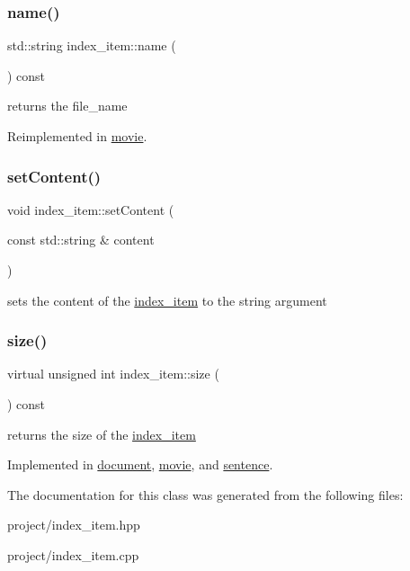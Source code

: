 \subsubsection{\texorpdfstring{name()}{name()}}
{\footnotesize\ttfamily std\+::string index\+\_\+item\+::name (\begin{DoxyParamCaption}{ }\end{DoxyParamCaption}) const\hspace{0.3cm}{\ttfamily [virtual]}}

returns the file\+\_\+name 

Reimplemented in \hyperlink{classmovie_ab8731bf52d5a7374ecc7ac297e3b99c3}{movie}.

\mbox{\label{classindex__item_a2a69d5f19a1e7056fef20df01dbc489e}} 
\subsubsection{\texorpdfstring{set\+Content()}{setContent()}}
{\footnotesize\ttfamily void index\+\_\+item\+::set\+Content (\begin{DoxyParamCaption}\item[{const std\+::string \&}]{content }\end{DoxyParamCaption})}

sets the content of the \hyperlink{classindex__item}{index\+\_\+item} to the string argument \mbox{\label{classindex__item_ae8ccce55ab973b1a2faa99df65e19051}} 
\subsubsection{\texorpdfstring{size()}{size()}}
{\footnotesize\ttfamily virtual unsigned int index\+\_\+item\+::size (\begin{DoxyParamCaption}{ }\end{DoxyParamCaption}) const\hspace{0.3cm}{\ttfamily [pure virtual]}}

returns the size of the \hyperlink{classindex__item}{index\+\_\+item} 

Implemented in \hyperlink{classdocument_a45717a4aeff4409b769f0c6f9f72a6f1}{document}, \hyperlink{classmovie_a06e70f5ada3d72a74ad52a8b49f5cd70}{movie}, and \hyperlink{classsentence_afbe71af6de10ac098acaca7be2adf517}{sentence}.



The documentation for this class was generated from the following files\+:\begin{DoxyCompactItemize}
\item 
project/index\+\_\+item.\+hpp\item 
project/index\+\_\+item.\+cpp\end{DoxyCompactItemize}
